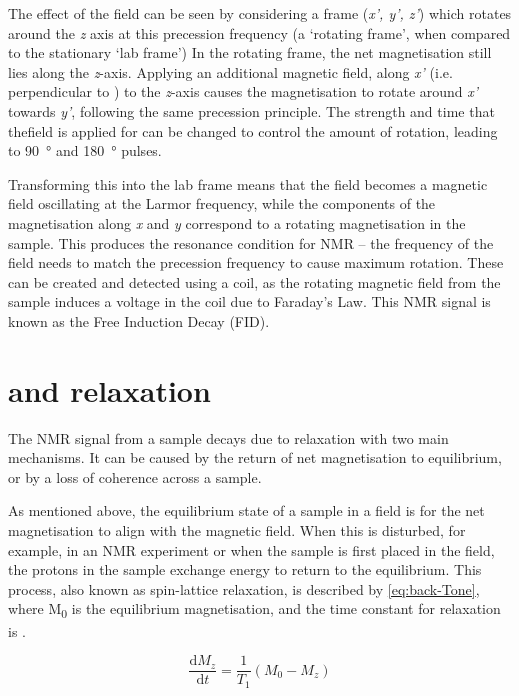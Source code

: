 The effect of the \Bone field can be seen by considering a frame (\textit{x', y', z'}) which rotates around the \textit{z} axis at this precession frequency (a `rotating frame', when compared to the stationary `lab frame')
In the rotating frame, the net magnetisation still lies along the \textit{z}-axis.
Applying an additional magnetic field, along \textit{x'} (i.e. perpendicular to \Bzero) to the \textit{z}-axis causes the magnetisation to rotate around \textit{x'} towards \textit{y'}, following the same precession principle.
The strength and time that the\Bone field is applied for can be changed to control the amount of rotation, leading to \SI{90}{\degree} and \SI{180}{\degree} pulses.

Transforming this into the lab frame means that the \Bone field becomes a magnetic field oscillating at the Larmor frequency,
while the components of the magnetisation along \textit{x} and \textit{y} correspond to a rotating magnetisation in the sample.
This produces the resonance condition for NMR -- the frequency of the \Bone field needs to match the precession frequency to cause maximum rotation.
These can be created and detected using a coil, as the rotating magnetic field from the sample induces a voltage in the coil due to Faraday's Law.
This NMR signal is known as the Free Induction Decay (FID).

\section{\Tone and \Ttwo relaxation}
The NMR signal from a sample decays due to relaxation with two main mechanisms.
It can be caused by the return of net magnetisation to equilibrium, or by a loss of coherence across a sample.

As mentioned above, the equilibrium state of a sample in a \Bzero field is for the net magnetisation to align with the \Bzero magnetic field.
When this is disturbed, for example, in an NMR experiment or when the sample is first placed in the \Bzero field, the protons in the sample exchange energy to return to the equilibrium.
This process, also known as spin-lattice relaxation, is described by \autoref{eq:back-Tone}, where M\textsubscript{0} is the equilibrium magnetisation, and the time constant for relaxation is \Tone.

\begin{equation}
\frac{\mathrm{d} M_z}{\mathrm{d} t} = \frac{1}{T_1} (M_0-M_z)
\label{eq:back-Tone}
\end{equation}

